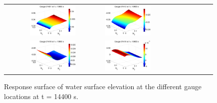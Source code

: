 \begin{figure}[h]
\centering

\begin{tabular}{clcl}
\includegraphics[width=0.5\textwidth]{./figures/response_i1_t3.pdf} &
\includegraphics[width=0.5\textwidth]{./figures/response_i2_t3.pdf} \\
\includegraphics[width=0.5\textwidth]{./figures/response_i3_t3.pdf} &
\includegraphics[width=0.5\textwidth]{./figures/response_i4_t3.pdf}
\end{tabular}
\caption{Response surface of water surface elevation at the different gauge locations at t = 14400 s.}
\label{fig:response3}
\end{figure}

